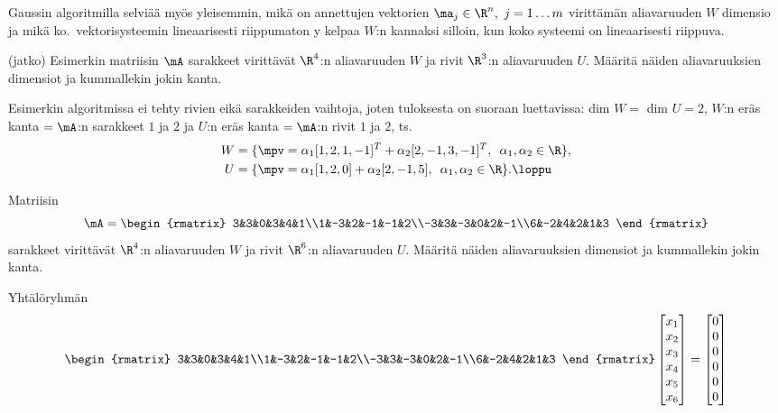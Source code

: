 Gaussin algoritmilla selviää myös yleisemmin, mikä on annettujen vektorien
$\ma_j\in\R^n,\ j=1 \ldots m$ virittämän aliavaruuden $W$ dimensio ja mikä ko.\
vektorisysteemin lineaarisesti riippumaton y kelpaa $W$:n kannaksi 
silloin, kun koko systeemi on lineaarisesti riippuva.
\jatko \begin{Exa} (jatko) Esimerkin matriisin $\mA$ sarakkeet virittävät $\R^4$:n aliavaruuden
$W$ ja rivit $\R^3$:n aliavaruuden $U$. Määritä näiden aliavaruuksien dimensiot ja kummallekin 
jokin kanta.
\end{Exa}
\ratk
Esimerkin algoritmissa ei tehty rivien eikä sarakkeiden vaihtoja, joten tuloksesta on suoraan 
luettavissa: dim $W=$ dim $U=2$, $W$:n eräs kanta $=\mA$:n sarakkeet $1$ ja $2$ ja $U$:n eräs 
kanta $=\mA$:n rivit $1$ ja $2$, ts.\
\begin{align*}
W &= \{\mpv=\alpha_1[1,2,1,-1]^T+\alpha_2[2,-1,3,-1]^T,\,\ \alpha_1,\alpha_2\in\R\}, \\
U &= \{\mpv=\alpha_1[1,2,0]+\alpha_2[2,-1,5],\,\ \alpha_1,\alpha_2\in\R\}. \loppu
\end{align*}
\begin{Exa} Matriisin
\[
\mA=\begin{rmatrix}
    3&3&0&3&4&1\\1&-3&2&-1&-1&2\\-3&3&-3&0&2&-1\\6&-2&4&2&1&3
    \end{rmatrix}
\]
sarakkeet virittävät $\R^4$:n aliavaruuden $W$ ja rivit $\R^6$:n aliavaruuden $U$. Määritä
näiden aliavaruuksien dimensiot ja kummallekin jokin kanta.
\end{Exa}
\ratk Yhtälöryhmän
\[
\begin{rmatrix}
3&3&0&3&4&1\\1&-3&2&-1&-1&2\\-3&3&-3&0&2&-1\\6&-2&4&2&1&3
\end{rmatrix}
\begin{bmatrix} x_1\\x_2\\x_3\\x_4\\x_5\\x_6 \end{bmatrix} =
\begin{bmatrix} 0\\0\\0\\0\\0\\0 \end{bmatrix}
\]
